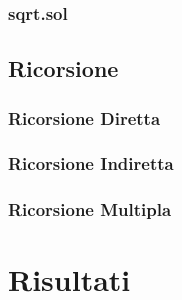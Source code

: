         \subsubsection{sqrt.sol}

    \subsection{Ricorsione}

        \subsubsection{Ricorsione Diretta}

        \subsubsection{Ricorsione Indiretta}
        
        \subsubsection{Ricorsione Multipla}
    
\section{Risultati}

